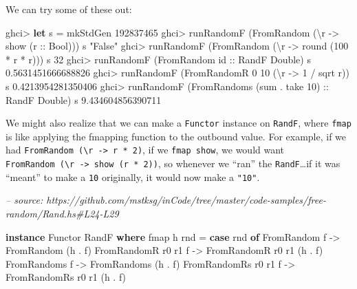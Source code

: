 \documentclass[]{article}
\newenvironment{Shaded}{}{}
\newcommand{\CommentTok}[1]{\textcolor[rgb]{0.38,0.63,0.69}{\textit{#1}}}
\newcommand{\DataTypeTok}[1]{\textcolor[rgb]{0.56,0.13,0.00}{#1}}
\newcommand{\DecValTok}[1]{\textcolor[rgb]{0.25,0.63,0.44}{#1}}
\newcommand{\FloatTok}[1]{\textcolor[rgb]{0.25,0.63,0.44}{#1}}
\newcommand{\FunctionTok}[1]{\textcolor[rgb]{0.02,0.16,0.49}{#1}}
\newcommand{\KeywordTok}[1]{\textcolor[rgb]{0.00,0.44,0.13}{\textbf{#1}}}
\newcommand{\NormalTok}[1]{#1}
\newcommand{\OtherTok}[1]{\textcolor[rgb]{0.00,0.44,0.13}{#1}}
\newcommand{\StringTok}[1]{\textcolor[rgb]{0.25,0.44,0.63}{#1}}
\begin{document}
We can try some of these out:

\begin{Shaded}
\begin{Highlighting}[]
\NormalTok{ghci}\FunctionTok{>} \KeywordTok{let}\NormalTok{ s }\FunctionTok{=}\NormalTok{ mkStdGen }\DecValTok{192837465}
\NormalTok{ghci}\FunctionTok{>}\NormalTok{ runRandomF (}\DataTypeTok{FromRandom}\NormalTok{ (\textbackslash{}r }\OtherTok{->}\NormalTok{ show (}\OtherTok{r ::} \DataTypeTok{Bool}\NormalTok{))) s}
\StringTok{"False"}
\NormalTok{ghci}\FunctionTok{>}\NormalTok{ runRandomF (}\DataTypeTok{FromRandom}\NormalTok{ (\textbackslash{}r }\OtherTok{->}\NormalTok{ round (}\DecValTok{100} \FunctionTok{*}\NormalTok{ r }\FunctionTok{*}\NormalTok{ r))) s}
\DecValTok{32}
\NormalTok{ghci}\FunctionTok{>}\NormalTok{ runRandomF (}\DataTypeTok{FromRandom}\OtherTok{ id ::} \DataTypeTok{RandF} \DataTypeTok{Double}\NormalTok{) s}
\FloatTok{0.5631451666688826}
\NormalTok{ghci}\FunctionTok{>}\NormalTok{ runRandomF (}\DataTypeTok{FromRandomR} \DecValTok{0} \DecValTok{10}\NormalTok{ (\textbackslash{}r }\OtherTok{->} \DecValTok{1} \FunctionTok{/}\NormalTok{ sqrt r)) s}
\FloatTok{0.4213954281350406}
\NormalTok{ghci}\FunctionTok{>}\NormalTok{ runRandomF (}\DataTypeTok{FromRandoms}\NormalTok{ (sum }\FunctionTok{.}\NormalTok{ take }\DecValTok{10}\NormalTok{)}\OtherTok{ ::} \DataTypeTok{RandF} \DataTypeTok{Double}\NormalTok{) s}
\FloatTok{9.434604856390711}
\end{Highlighting}
\end{Shaded}

We might also realize that we can make a \texttt{Functor} instance on
\texttt{RandF}, where \texttt{fmap} is like applying the fmapping function to
the outbound value. For example, if we had
\texttt{FromRandom\ (\textbackslash{}r\ -\textgreater{}\ r\ *\ 2)}, if we
\texttt{fmap\ show}, we would want
\texttt{FromRandom\ (\textbackslash{}r\ -\textgreater{}\ show\ (r\ *\ 2))}, so
whenever we ``ran'' the \texttt{RandF}\ldots{}if it was ``meant'' to make a
\texttt{10} originally, it would now make a \texttt{"10"}.

\begin{Shaded}
\begin{Highlighting}[]
\CommentTok{-- source: https://github.com/mstksg/inCode/tree/master/code-samples/free-random/Rand.hs#L24-L29}

\KeywordTok{instance} \DataTypeTok{Functor} \DataTypeTok{RandF} \KeywordTok{where}
\NormalTok{    fmap h rnd }\FunctionTok{=} \KeywordTok{case}\NormalTok{ rnd }\KeywordTok{of}
        \DataTypeTok{FromRandom}\NormalTok{         f }\OtherTok{->} \DataTypeTok{FromRandom}\NormalTok{         (h }\FunctionTok{.}\NormalTok{ f)}
        \DataTypeTok{FromRandomR}\NormalTok{ r0 r1  f }\OtherTok{->} \DataTypeTok{FromRandomR}\NormalTok{ r0 r1  (h }\FunctionTok{.}\NormalTok{ f)}
        \DataTypeTok{FromRandoms}\NormalTok{        f }\OtherTok{->} \DataTypeTok{FromRandoms}\NormalTok{        (h }\FunctionTok{.}\NormalTok{ f)}
        \DataTypeTok{FromRandomRs}\NormalTok{ r0 r1 f }\OtherTok{->} \DataTypeTok{FromRandomRs}\NormalTok{ r0 r1 (h }\FunctionTok{.}\NormalTok{ f)}
\end{Highlighting}
\end{Shaded}
\end{document}
